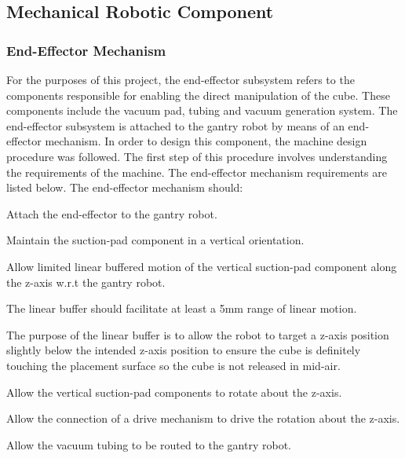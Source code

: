 \subsection{Mechanical Robotic Component} \label{sec:Mechancial Robotic Component}

\subsubsection{End-Effector Mechanism}

For the purposes of this project, the end-effector subsystem refers to the components responsible for enabling the direct manipulation of the cube. These components include the vacuum pad, tubing and vacuum generation system. The end-effector subsystem is attached to the gantry robot by means of an end-effector mechanism. In order to design this component, the machine design procedure was followed. The first step of this procedure involves understanding the requirements of the machine. The end-effector mechanism requirements are listed below. The end-effector mechanism should:

\begin{compactitem}
	\item Attach the end-effector to the gantry robot.
	\item Maintain the suction-pad component in a vertical orientation.
	\item Allow limited linear buffered motion of the vertical suction-pad component along the z-axis w.r.t the gantry robot.
	\item The linear buffer should facilitate at least a 5mm range of linear motion.
	\item The purpose of the linear buffer is to allow the robot to target a z-axis position slightly below the intended z-axis position to ensure the cube is definitely touching the placement surface so the cube is not released in mid-air.
	\item Allow the vertical suction-pad components to rotate about the z-axis.
	\item Allow the connection of a drive mechanism to drive the rotation about the z-axis.
	\item Allow the vacuum tubing to be routed to the gantry robot.
\end{compactitem}

